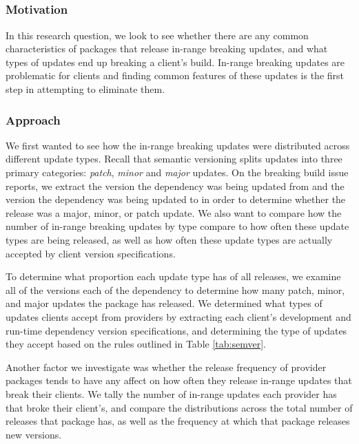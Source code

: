 \subsection{\rqone}
\label{sec:results:rq1}
\subsubsection{Motivation}
In this research question, we look to see whether there are any common characteristics of packages that release in-range breaking updates, and what types of updates end up breaking a client's build. In-range breaking updates are problematic for clients and finding common features of these updates is the first step in attempting to eliminate them.

\subsubsection{Approach}
We first wanted to see how the in-range breaking updates were distributed across different update types. Recall that semantic versioning splits updates into three primary categories: \textit{patch}, \textit{minor} and \textit{major} updates. On the breaking build issue reports, we extract the version the dependency was being updated from and the version the dependency was being updated to in order to determine whether the release was a major, minor, or patch update. We also want to compare how the number of in-range breaking updates by type compare to how often these update types are being released, as well as how often these update types are actually accepted by client version specifications.
\par
To determine what proportion each update type has of all releases, we examine all of the versions each of the dependency to determine how many patch, minor, and major updates the package has released. We determined what types of updates clients accept from providers by extracting each client's development and run-time dependency version specifications, and determining the type of updates they accept based on the rules outlined in Table \ref{tab:semver}.
\par
Another factor we investigate was whether the release frequency of provider packages tends to have any affect on how often they release in-range updates that break their clients. We tally the number of in-range updates each provider has that broke their client's, and compare the distributions across the total number of releases that package has, as well as the frequency at which that package releases new versions.

